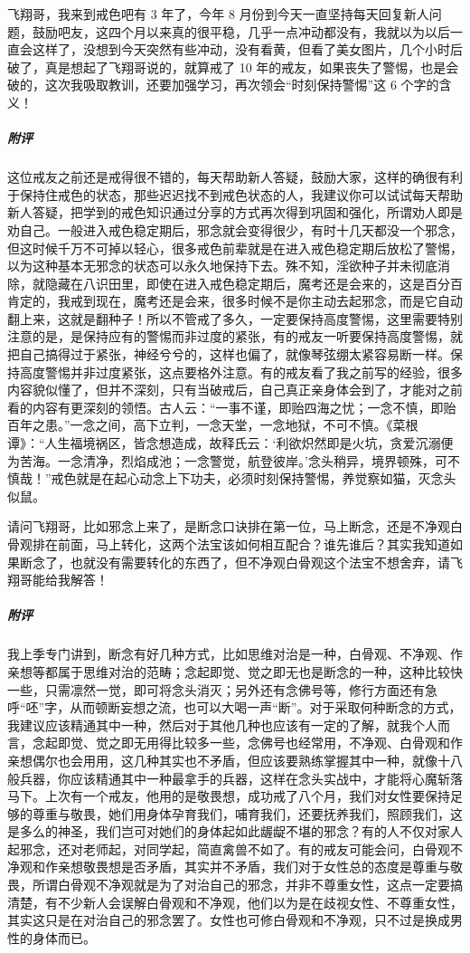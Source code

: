 \begin{case}
    飞翔哥，我来到戒色吧有 3 年了，今年 8 月份到今天一直坚持每天回复新人问题，鼓励吧友，这四个月以来真的很平稳，几乎一点冲动都没有，我就以为以后一直会这样了，没想到今天突然有些冲动，没有看黄，但看了美女图片，几个小时后破了，真是想起了飞翔哥说的，就算戒了 10 年的戒友，如果丧失了警惕，也是会破的，这次我吸取教训，还要加强学习，再次领会“时刻保持警惕”这 6 个字的含义！
    \subparagraph{附评} 这位戒友之前还是戒得很不错的，每天帮助新人答疑，鼓励大家，这样的确很有利于保持住戒色的状态，那些迟迟找不到戒色状态的人，我建议你可以试试每天帮助新人答疑，把学到的戒色知识通过分享的方式再次得到巩固和强化，所谓劝人即是劝自己。一般进入戒色稳定期后，邪念就会变得很少，有时十几天都没一个邪念，但这时候千万不可掉以轻心，很多戒色前辈就是在进入戒色稳定期后放松了警惕，以为这种基本无邪念的状态可以永久地保持下去。殊不知，淫欲种子并未彻底消除，就隐藏在八识田里，即使在进入戒色稳定期后，魔考还是会来的，这是百分百肯定的，我戒到现在，魔考还是会来，很多时候不是你主动去起邪念，而是它自动翻上来，这就是翻种子！所以不管戒了多久，一定要保持高度警惕，这里需要特别注意的是，是保持应有的警惕而非过度的紧张，有的戒友一听要保持高度警惕，就把自己搞得过于紧张，神经兮兮的，这样也偏了，就像琴弦绷太紧容易断一样。保持高度警惕并非过度紧张，这点要格外注意。有的戒友看了我之前写的经验，很多内容貌似懂了，但并不深刻，只有当破戒后，自己真正亲身体会到了，才能对之前看的内容有更深刻的领悟。古人云：“一事不谨，即贻四海之忧；一念不慎，即贻百年之患。”一念之间，高下立判，一念天堂，一念地狱，不可不慎。《菜根谭》：“人生福境祸区，皆念想造成，故释氏云：‘利欲炽然即是火坑，贪爱沉溺便为苦海。一念清净，烈焰成池；一念警觉，航登彼岸。’念头稍异，境界顿殊，可不慎哉！”戒色就是在起心动念上下功夫，必须时刻保持警惕，养觉察如猫，灭念头似鼠。
\end{case}

\begin{case}
    请问飞翔哥，比如邪念上来了，是断念口诀排在第一位，马上断念，还是不净观白骨观排在前面，马上转化，这两个法宝该如何相互配合？谁先谁后？其实我知道如果断念了，也就没有需要转化的东西了，但不净观白骨观这个法宝不想舍弃，请飞翔哥能给我解答！
    \subparagraph{附评} 我上季专门讲到，断念有好几种方式，比如思维对治是一种，白骨观、不净观、作亲想等都属于思维对治的范畴；念起即觉、觉之即无也是断念的一种，这种比较快一些，只需凛然一觉，即可将念头消灭；另外还有念佛号等，修行方面还有急呼“呸”字，从而顿断妄想之流，也可以大喝一声“断”。对于采取何种断念的方式，我建议应该精通其中一种，然后对于其他几种也应该有一定的了解，就我个人而言，念起即觉、觉之即无用得比较多一些，念佛号也经常用，不净观、白骨观和作亲想偶尔也会用用，这几种其实也不矛盾，但应该要熟练掌握其中一种，就像十八般兵器，你应该精通其中一种最拿手的兵器，这样在念头实战中，才能将心魔斩落马下。上次有一个戒友，他用的是敬畏想，成功戒了八个月，我们对女性要保持足够的尊重与敬畏，她们用身体孕育我们，哺育我们，还要抚养我们，照顾我们，这是多么的神圣，我们岂可对她们的身体起如此龌龊不堪的邪念？有的人不仅对家人起邪念，还对老师起，对同学起，简直禽兽不如了。有的戒友可能会问，白骨观不净观和作亲想敬畏想是否矛盾，其实并不矛盾，我们对于女性总的态度是尊重与敬畏，所谓白骨观不净观就是为了对治自己的邪念，并非不尊重女性，这点一定要搞清楚，有不少新人会误解白骨观和不净观，他们以为是在歧视女性、不尊重女性，其实这只是在对治自己的邪念罢了。女性也可修白骨观和不净观，只不过是换成男性的身体而已。
\end{case}

